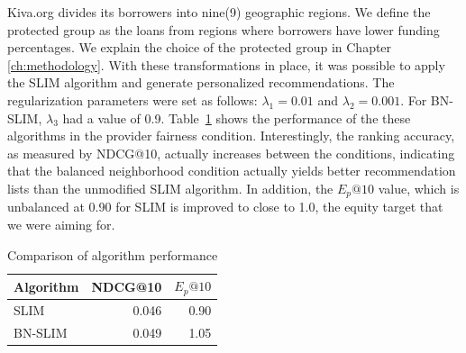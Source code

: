 
Kiva.org divides its borrowers into nine(9) geographic regions. We define the protected group as the loans from regions where borrowers have lower funding percentages. We explain the choice of the protected group in Chapter \ref{ch:methodology}. With these transformations in place, it was possible to apply the SLIM algorithm and generate personalized recommendations. The regularization parameters were set as follows: $\lambda_1 = 0.01$ and $\lambda_2 = 0.001$. For BN-SLIM, $\lambda_3$ had a value of 0.9. Table~\ref{tab:results} shows the performance of the these algorithms in the provider fairness condition. Interestingly, the ranking accuracy, as measured by NDCG@10, actually increases between the conditions, indicating that the balanced neighborhood condition actually yields better recommendation lists than the unmodified SLIM algorithm. In addition, the $E_p@10$ value, which is unbalanced at 0.90 for SLIM is improved to close to 1.0, the equity target that we were aiming for.




\begin{table}
    \centering
\begin{tabular}{l|r|r}
    Algorithm & NDCG@10 & $E_p@10$ \\ \hline
    SLIM & 0.046 & 0.90 \\ \hline
    BN-SLIM & 0.049 & 1.05 \\ \hline
\end{tabular}
    \caption{Comparison of algorithm performance}
    \label{tab:results}
\end{table}


